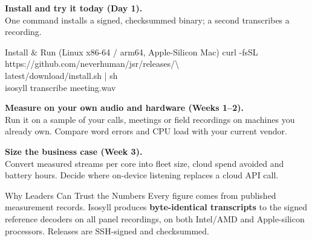 \documentclass[letterpaper]{article}
\begin{document}
\noindent
\begin{minipage}[t]{0.478\textwidth}
  \vspace{0pt}
  \vspace{1pt}
  {\fontsize{7.75}{9.7}\selectfont\raggedright
  \noindent{}\;\textbf{Install and try it today (Day 1).}\\
  One command installs a signed, checksummed binary; a second transcribes a recording.
  }
  \begin{codecard}{Install \& Run (Linux x86-64 / arm64, Apple-Silicon Mac)}
curl -fsSL https://github.com/neverhuman/jsr/releases/\textbackslash\\
\hspace*{1.2em}latest/download/install.sh | sh\\
isosyll transcribe meeting.wav
  \end{codecard}
  {\fontsize{7.75}{9.7}\selectfont\raggedright

  \vspace{2.5pt}
  \noindent{}\;\textbf{Measure on your own audio and hardware (Weeks 1--2).}\\
  Run it on a sample of your calls, meetings or field recordings on machines you already own. Compare word errors and CPU load with your current vendor.

  \vspace{2.5pt}
  \noindent{}\;\textbf{Size the business case (Week 3).}\\
  Convert measured streams per core into fleet size, cloud spend avoided and battery hours. Decide where on-device listening replaces a cloud API call.
  }

  \vspace{3pt}
  \begin{execbox}[emerald]{Why Leaders Can Trust the Numbers}
    Every figure comes from published measurement records. Isosyll produces \textbf{byte-identical transcripts} to the signed reference decoders on all \ScalarUtts{} panel recordings, on both Intel/AMD and Apple-silicon processors. Releases are SSH-signed and checksummed.
  \end{execbox}
\end{minipage}\hfill
\end{document}
